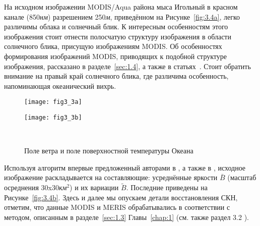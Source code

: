 На исходном изображении MODIS/Aqua района мыса Игольный в красном канале (850\textit{нм}) разрешением 250\textit{м}, приведённом на Рисунке~\ref{fig:3.4a}, легко различимы облака и солнечный блик. К интересным особенностям этого изображения стоит отнести полосчатую структуру изображения в области солнечного блика, присущую изображениям MODIS. Об особенностях формирования изображений MODIS, приводящих к подобной структуре изображения, рассказано в разделе~\ref{sec:1.4}, а также в статьях~\citep{Myasoedov2010a, Myasoedov2010}. Стоит обратить внимание на правый край солнечного блика, где различима особенность, напоминающая океанический вихрь.



\begin{figure}[H]
   	\centering
	\begin{minipage}{.47\textwidth}
	    \subcaptionbox{\label{fig:3.3a}}
		{\texttt{[image: fig3\_3a]}}
	\end{minipage}
	\hfill
	\begin{minipage}{.47\textwidth}
	    \subcaptionbox{\label{fig:3.3b}}
		{\texttt{[image: fig3\_3b]}}
	\end{minipage}
    \\
    \caption{Поле ветра и поле поверхностной температуры Океана}
    \label{fig:3.3}
\end{figure}


Используя алгоритм впервые предложенный авторами в \citep{Kudryavtsev2010,Myasoedov2010a}, а также в \citep{Myasoedov2010}, исходное изображение раскладывается на составляющие: усреднённые яркости $\bar{B}$ (масштаб осреднения 30x30\textit{км${}^2$}) и их вариации $\tilde{B}$. Последние приведены на Рисунке~\ref{fig:3.4b}. Здесь и далее мы опускаем детали восстановления СКН, отметим, что данные MODIS и MERIS обрабатывались в соответствии с методом, описанным в разделе~\ref{sec:1.3} Главы~\ref{chap:1} (см. также раздел 3.2 \citep{Myasoedov2010}).



